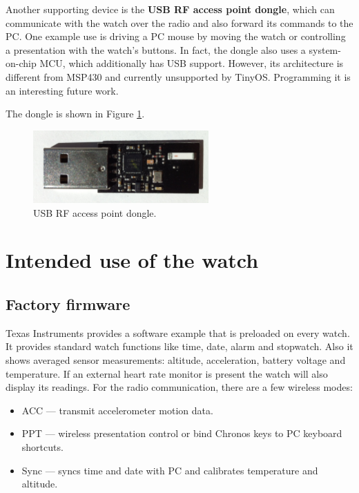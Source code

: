 Another supporting device is the {\bf USB RF access point dongle},
which can communicate with the watch over the radio and also forward
its commands to the PC. One example use is driving a PC mouse by
moving the watch or controlling a presentation with the watch's
buttons. In fact, the dongle also uses a system-on-chip MCU, which
additionally has USB support. However, its architecture is different
from MSP430 and currently unsupported by TinyOS. Programming it is an
interesting future work.

The dongle is shown in Figure \ref{fig:chronos_rfdongle}.

\begin{figure}[h]
  \centering
  \includegraphics[width=0.6\textwidth]{img/chronos_rfdongle.jpg}
  \caption{USB RF access point dongle.}
  \label{fig:chronos_rfdongle}
\end{figure}

\section{Intended use of the watch}

\subsection{Factory firmware}

Texas Instruments provides a software example that is preloaded on every
watch. It provides standard watch functions like time, date, alarm and
stopwatch. Also it shows averaged sensor measurements: altitude,
acceleration, battery voltage and temperature. If an external  heart
rate monitor is present the watch will also display its readings. For
the radio communication, there are a few wireless modes:

\begin{itemize}
  \item ACC --- transmit accelerometer motion data.
  \item PPT --- wireless presentation control or bind Chronos
    keys to PC keyboard shortcuts.
  \item Sync --- syncs time and date with PC and calibrates
    temperature and altitude. %
\end{itemize}

